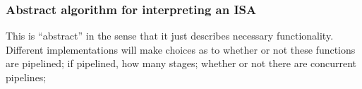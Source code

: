 
\begin{frame}
\frametitle{Abstract algorithm for interpreting an ISA}

\footnotesize

\begin{center}
\end{center}

This is ``abstract'' in the sense that it just describes necessary
functionality.  Different implementations will make choices as to
whether or not these functions are pipelined; if pipelined, how many
stages; whether or not there are concurrent pipelines; {\etc}

\end{frame}






